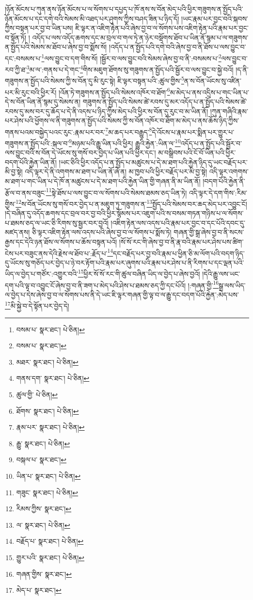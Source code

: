 །ཉོན་མོངས་པ་ཀུན་ནས་ཉོན་མོངས་པ་ལ་སོགས་པ་དཔྱད་པ་ཁོ་ནས་ས་བོན་མེད་པའི་ཕྱིར་གཟུགས་ན་སྤྱོད་པའི་ཉོན་མོངས་པ་དང་དགེ་བའི་སེམས་མི་འཐད་པར་ཤུགས་ཀྱིས་བཤད་ཟིན་པ་ཉིད་དོ། །ཡང་རྣམ་པར་བྱང་བའི་སྐབས་ཀྱིས་བསྟན་པར་བྱ་བ་ཡིན་པས། ཇི་ལྟར་ན་འཇིག་རྟེན་པའི་ཞེས་བྱ་བ་ལ་སོགས་པས་འཇིག་རྟེན་པའི་རྣམ་པར་བྱང་བ་སྟོན་ཏོ། །
འདོད་པ་ལས་འདོད་ཆགས་དང་མ་བྲལ་བ་གལ་ཏེ་ན་ཉེར་བསྡོགས་ཐོབ་པ་ཡིན་ནོ་སྙམ་པ་ལ་གཟུགས་ན་སྤྱོད་པའི་སེམས་མ་ཐོབ་པ་ཞེས་བྱ་བ་སྨོས་སོ། །འདོད་པ་ན་སྤྱོད་པའི་དགེ་བའི་ཞེས་བྱ་བ་ནི་ཐོས་པ་ལས་བྱུང་བ་དང་:བསམས་པ་\footnote{བསམ་པ་  སྣར་ཐང་།  པེ་ཅིན། }ལས་བྱུང་བ་དག་གིས་སོ། །སྦྱོར་བ་ལས་བྱུང་བའི་སེམས་ཞེས་བྱ་བ་ནི་:བསམས་པ་\footnote{བསམ་པ་  སྣར་ཐང་། }ལས་བྱུང་བ་རབ་ཀྱི་ཐ་\footnote{མཐར་  སྣར་ཐང་།  པེ་ཅིན། }མ་ལ་:གནས་པ་དེ་གང་\footnote{གནས་དག་  སྣར་ཐང་།  པེ་ཅིན། }གིས་མཇུག་ཐོགས་སུ་གཟུགས་ན་སྤྱོད་པའི་སྦྱོར་བ་ལས་བྱུང་བ་སྐྱེ་བའོ། །ད་ནི་གཟུགས་ན་སྤྱོད་པའི་སེམས་ཀྱི་ས་བོན་དུ་མི་རུང་སྟེ། ཇི་ལྟར་བསྟན་པའི་:ཚུལ་གྱིས་\footnote{ཚུལ་གྱི་  པེ་ཅིན། }ན་ས་བོན་ཡོངས་སུ་འཛིན་པར་མི་རུང་བའི་ཕྱིར་རོ། །འོན་ཏེ་གཟུགས་ན་སྤྱོད་པའི་སེམས་འཁོར་བ་ཐོག་\footnote{ཐོགས་  སྣར་ཐང་།  པེ་ཅིན། }མ་མེད་པ་ནས་འདྲིས་པ་གང་ཡིན་པ་དེ་ས་བོན་ཡིན་ནོ་སྙམ་དུ་སེམས་ན། གཟུགས་ན་སྤྱོད་པའི་སེམས་ཚེ་རབས་དུ་མར་འདོད་པ་ན་སྤྱོད་པའི་སེམས་ཚེ་རབས་དུ་མས་བར་དུ་ཆོད་པ་དེ་ནི་འདས་པ་ཉིད་ཀྱིས་མེད་པའི་ཕྱིར་ས་བོན་དུ་རུང་བ་མ་ཡིན་ནོ། །ཀུན་གཞིའི་རྣམ་པར་ཤེས་པའི་ཕྱོགས་ལ་ནི་གཟུགས་ན་སྤྱོད་པའི་སེམས་ཀྱི་ས་བོན་འཁོར་བ་ཐོག་མ་མེད་པ་ནས་ཆོས་ཉིད་ཀྱིས་གནས་པའམ་བསྐྱེད་པའང་རུང་:རྣམ་པར་བར་\footnote{རྣམ་པར་  སྣར་ཐང་།  པེ་ཅིན། }མ་ཆད་པར་བརྒྱུད་\footnote{རྒྱུ་  སྣར་ཐང་།  པེ་ཅིན། }དེ་འོངས་པ་རྣམ་པར་སྨིན་པར་གྱུར་པ་གཟུགས་ན་སྤྱོད་པའི་:སྐལ་བ་\footnote{བསྐལ་པ་  སྣར་ཐང་། }མཉམ་པའི་རྒྱུ་ཡིན་པའི་ཕྱིར། རྒྱུའི་རྐྱེན་:ཡིན་ལ་\footnote{ཡིན་པ་  སྣར་ཐང་།  པེ་ཅིན། }འདོད་པ་ན་སྤྱོད་པའི་སྦྱོར་བ་ལས་བྱུང་བའི་ས་བོན་དེ་ཡོངས་སུ་གསོ་བར་བྱེད་པ་ཡིན་པའི་ཕྱིར་དང་། མ་བསྒྲིབས་པའི་ངོ་བོ་ཡིན་པའི་ཕྱིར་བདག་པོའི་རྐྱེན་ཡིན་ནོ། །ཡང་ཅིའི་ཕྱིར་འདོད་པ་ན་སྤྱོད་པ་མཚུངས་པ་དེ་མ་ཐག་པའི་རྐྱེན་ཉིད་དུ་ཡང་བརྗོད་པར་མི་བྱ་སྟེ། འདི་ལྟར་དེ་ནི་འགགས་མ་ཐག་པ་ཡིན་ནོ་ཞེ་ན། མ་ཁྱབ་པའི་ཕྱིར་བརྗོད་པར་མི་བྱ་སྟེ། འདི་ལྟར་འགགས་མ་ཐག་པ་གང་ཡིན་པ་དེ་ཁོ་ན་མཚུངས་པ་དེ་མ་ཐག་པའི་རྐྱེན་ཡིན་གྱི་གཞན་ནི་མ་ཡིན་ནོ། །བདག་པོའི་རྐྱེན་ནི་རྩོལ་བ་ནས་བཟུང་\footnote{གཟུང་  སྣར་ཐང་།  པེ་ཅིན། }སྟེ་ཐོས་པ་ལས་བྱུང་བ་ལ་སོགས་པའི་སེམས་ཐམས་ཅད་ཡིན་ཏེ། འདི་ལྟར་དེ་དག་གིས་:རིམ་གྱིས་\footnote{རིམས་ཀྱིས་  སྣར་ཐང་། }ས་བོན་ཡོངས་སུ་གསོ་བར་བྱེད་པ་ན་མཇུག་ཏུ་གཟུགས་ན་\footnote{ལ་  སྣར་ཐང་།  པེ་ཅིན། }སྤྱོད་པའི་སེམས་བར་ཆད་མེད་པར་འབྱུང་ངོ། །དེ་བཞིན་དུ་འདོད་ཆགས་དང་བྲལ་བར་བྱ་བའི་ཕྱིར་སྙོམས་པར་འཇུག་པའི་ས་བསམ་གཏན་གཉིས་པ་ལ་སོགས་པ་ཐམས་ཅད་ལ་ཡང་ཅི་རིགས་སུ་སྦྱར་བར་བྱའོ། །འཇིག་རྟེན་ལས་འདས་པའི་རྣམ་པར་བྱང་བ་དང་པོའི་དབང་དུ་མཛད་ནས། ཅི་ལྟར་འཇིག་རྟེན་ལས་འདས་པའི་ཞེས་བྱ་བ་ལ་སོགས་པ་སྨོས་ཏེ། གཞན་གྱི་སྒྲ་ཞེས་བྱ་བ་ནི་སངས་རྒྱས་དང་དེའི་ཉན་ཐོས་ལ་སོགས་པ་ཆོས་བསྟན་པའོ། །སོ་སོ་རང་གི་ཞེས་བྱ་བ་ནི་རྣ་བའི་རྣམ་པར་ཤེས་པས་ཚིག་ངེས་པར་བཟུང་ནས་དེའི་རྗེས་ལ་ཐོབ་པ་:རྗོད་པ་\footnote{བརྗོད་པ་  སྣར་ཐང་།  པེ་ཅིན། }དང་བརྗོད་པར་བྱ་བའི་རྣམ་པ་ཕྱིན་ཅི་མ་ལོག་པའི་བདག་ཉིད་དུ་ཡོངས་སུ་གཅོད་པར་བྱེད་པ་ཉེ་བར་རྟོག་པའི་རྣམ་པར་ཞུགས་པའི་རྣམ་པར་ཤེས་པ་ནི་རིགས་པ་དང་ལྡན་པའི་ཡིད་ལ་བྱེད་པ་གཙོར་:འགྱུར་བའི་\footnote{གྱུར་པའི་  སྣར་ཐང་།  པེ་ཅིན། }ཕྱིར་སོ་སོ་རང་གི་ཚུལ་བཞིན་ཡིད་ལ་བྱེད་པ་ཞེས་བྱའོ། །དེའི་རྒྱུ་ལས་ཡང་དག་པའི་ལྟ་བ་འབྱུང་ངོ་ཞེས་བྱ་བ་ནི་ཟག་པ་མེད་པའི་ཤེས་པ་ཐམས་ཅད་ཀྱི་དང་པོའོ། །:གཞན་གྱི་\footnote{གཞན་གྱིས་  སྣར་ཐང་། }སྒྲ་ལས་ཡིད་ལ་བྱེད་པ་དེས་ཞེས་བྱ་བ་ལ་སོགས་པས་ནི་དེ་ཡང་ཇི་ལྟར་གཞན་གྱི་ལྟ་བ་ལ་རྒྱུ་དང་བདག་པོའི་རྐྱེན་:མེད་པས་\footnote{མེད་པ་  སྣར་ཐང་། }མི་སྐྱེ་བ་དེ་སྟོན་པར་བྱེད་དེ། 